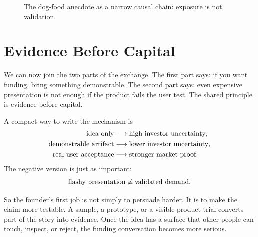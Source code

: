 \begin{figure}
\centering
{}
\caption{The dog-food anecdote as a narrow causal chain: exposure is not validation.}
\end{figure}

\section{Evidence Before Capital}

We can now join the two parts of the exchange. The first part says: if you want funding, bring something demonstrable. The second part says: even expensive presentation is not enough if the product fails the user test. The shared principle is evidence before capital.

A compact way to write the mechanism is
\begin{align}
\hbox{idea only}
&\longrightarrow
\hbox{high investor uncertainty},
\\
\hbox{demonstrable artifact}
&\longrightarrow
\hbox{lower investor uncertainty},
\\
\hbox{real user acceptance}
&\longrightarrow
\hbox{stronger market proof}.
\end{align}
The negative version is just as important:
\begin{equation}
\hbox{flashy presentation} \not\equiv \hbox{validated demand}.
\end{equation}

So the founder's first job is not simply to persuade harder. It is to make the claim more testable. A sample, a prototype, or a visible product trial converts part of the story into evidence. Once the idea has a surface that other people can touch, inspect, or reject, the funding conversation becomes more serious.

